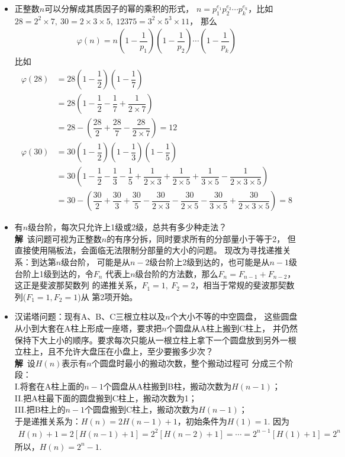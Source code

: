 \begin{itemize}[leftmargin=\inteval{\myitemleftmargin}pt,itemsep=
   \inteval{\myitemitempsep}pt,topsep=\inteval{\myitemtopsep}pt]
\item 正整数$ n $可以分解成其质因子的幂的乘积的形式，
$ n=p_1^{e_1}p_2^{e_2}\cdots p_k^{e_k} $，比如
$ 28=2^2\times 7,\ 30=2\times 3\times 5,\ 12375=3^2\times 5^3 \times 11 $，
那么
\begin{gather}\label{eulerPhi函数的计算公式}
    \varphi(n)=n\left(1-\dfrac{1}{p_1}\right)
    \left(1-\dfrac{1}{p_2}\right)\cdots \left(1-\dfrac{1}{p_k}\right)
\end{gather}
比如
\begin{align*}
    \varphi(28)&=28\left(1-\dfrac{1}{2}\right)\left(1-
    \dfrac{1}{7}\right) \\
    &=28\left(1-\dfrac{1}{2}-\dfrac{1}{7}+\dfrac{1}{2\times 7}\right) \\
    &=28-\left(\dfrac{28}{2}+\dfrac{28}{7}-\dfrac{28}{2\times 7}
    \right)=12 \\
    \varphi(30)&=30\left(1-\dfrac{1}{2}\right)
    \left(1-\dfrac{1}{3}\right)\left(1-\dfrac{1}{5}\right) \\
    &=30\left(1-\dfrac{1}{2}-\dfrac{1}{3}-\dfrac{1}{5}+
    \dfrac{1}{2\times 3}+\dfrac{1}{2\times 5}+\dfrac{1}{3\times 5}
    -\dfrac{1}{2\times 3\times 5}\right) \\
    &=30-\left(\dfrac{30}{2}+\dfrac{30}{3}+\dfrac{30}{5}-
    \dfrac{30}{2\times 3}-\dfrac{30}{2\times 5}-\dfrac{30}{3\times 5}
    +\dfrac{30}{2\times 3\times 5}\right)
    =8
\end{align*}

\item 有$ n $级台阶，每次只允许上1级或2级，总共有多少种走法？\\
\textbf{解}\ 该问题可视为正整数$ n $的有序分拆，同时要求所有的分部量小于等于2，
但直接使用隔板法，会面临无法限制分部量的大小的问题。
现改为寻找递推关系：到达第$ n $级台阶，
可能是从$ n-2 $级台阶上2级到达的，也可能是从$ n-1 $级台阶上1级到达的，令$ F_n $
代表上$ n $级台阶的方法数，那么$ F_n=F_{n-1}+F_{n-2} $，这正是斐波那契数列
的递推关系，$ F_1=1,\ F_2=2 $，相当于常规的斐波那契数列($ F_1=1,F_2=1 $)从
第2项开始。

\item 汉诺塔问题：现有A、B、C三根立柱以及$ n $个大小不等的中空圆盘，
这些圆盘从小到大套在A柱上形成一座塔，要求把$ n $个圆盘从A柱上搬到C柱上，
并仍然保持下大上小的顺序。要求每次只能从一根立柱上拿下一个圆盘放到另外一根
立柱上，且不允许大盘压在小盘上，至少要搬多少次？\\
\textbf{解}\ 设$ H(n) $表示有$ n $个圆盘时最小的搬动次数，整个搬动过程可
分成三个阶段：\\
I.将套在A柱上面的$ n-1 $个圆盘从A柱搬到B柱，搬动次数为$ H(n-1) $；\\
II.把A柱最下面的圆盘搬到C柱上，搬动次数为1；\\
III.把B柱上的$ n-1 $个圆盘搬到C柱上，搬动次数为$ H(n-1) $；\\
于是递推关系为：$ H(n)=2H(n-1)+1 $，初始条件为$ H(1)=1 $. 因为
\begin{align*}
    H(n)+1=2[H(n-1)+1]=2^2[H(n-2)+1]=\cdots=2^{n-1}[H(1)+1]=2^n
\end{align*}
所以，$ H(n)=2^n-1 $. 


\end{itemize}

